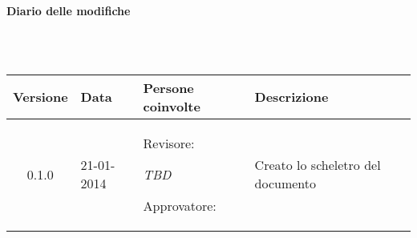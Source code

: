 \noindent\begin{Large}\textbf{Diario delle modifiche}\end{Large}\\
\\
\begin{small}
\begin{tabular}{|c|p{1.7cm}|p{2.8cm}|p{7cm}|}
\hline
Versione & Data & Persone coinvolte & Descrizione \\
\hline
\hline
0.1.0 & 21-01-2014 & Revisore: 

\textit{TBD}

Approvatore: 

\textit{} &  Creato lo scheletro del documento\\
\hline
\end{tabular}\\
\end{small}